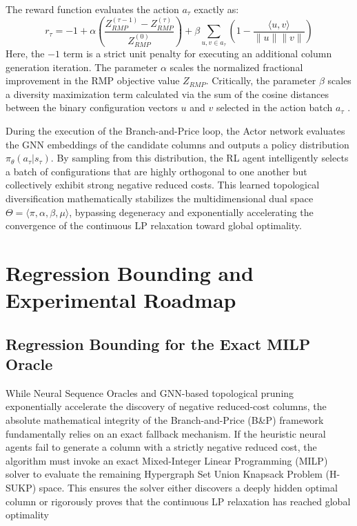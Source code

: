 \documentclass[11pt, a4paper]{book}
\begin{document}
	The reward function evaluates the action $a_\tau$ exactly as:
	\begin{equation}
		r_\tau = -1 + \alpha \left( \frac{Z_{RMP}^{(\tau-1)} - Z_{RMP}^{(\tau)}}{Z_{RMP}^{(0)}} \right) + \beta \sum_{u, v \in a_\tau} \left( 1 - \frac{\langle u, v \rangle}{\|u\| \|v\|} \right)
	\end{equation}
	Here, the $-1$ term is a strict unit penalty for executing an additional column generation iteration. The parameter $\alpha$ scales the normalized fractional improvement in the RMP objective value $Z_{RMP}$. Critically, the parameter $\beta$ scales a diversity maximization term calculated via the sum of the cosine distances between the binary configuration vectors $u$ and $v$ selected in the action batch $a_\tau$ %
	.
	
	During the execution of the Branch-and-Price loop, the Actor network evaluates the GNN embeddings of the candidate columns and outputs a policy distribution $\pi_\theta(a_\tau | s_\tau)$. By sampling from this distribution, the RL agent intelligently selects a batch of configurations that are highly orthogonal to one another but collectively exhibit strong negative reduced costs. This learned topological diversification mathematically stabilizes the multidimensional dual space $\Theta = \langle \pi, \alpha, \beta, \mu \rangle$, bypassing degeneracy and exponentially accelerating the convergence of the continuous LP relaxation toward global optimality.
	
	\section{Regression Bounding and Experimental Roadmap}
	
	\subsection{Regression Bounding for the Exact MILP Oracle}
	
	While Neural Sequence Oracles and GNN-based topological pruning exponentially accelerate the discovery of negative reduced-cost columns, the absolute mathematical integrity of the Branch-and-Price (B\&P) framework fundamentally relies on an exact fallback mechanism. If the heuristic neural agents fail to generate a column with a strictly negative reduced cost, the algorithm must invoke an exact Mixed-Integer Linear Programming (MILP) solver to evaluate the remaining Hypergraph Set Union Knapsack Problem (H-SUKP) space. This ensures the solver either discovers a deeply hidden optimal column or rigorously proves that the continuous LP relaxation has reached global optimality %
	
\end{document}
